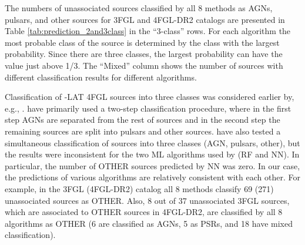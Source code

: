 The numbers of unassociated sources classified by all 8 methods as AGNs, pulsars, and other sources for 3FGL and 4FGL-DR2 catalogs are presented in Table \ref{tab:prediction_2and3class} in the ``3-class'' rows.
For each algorithm the most probable class of the source is determined by the class with the largest probability.
Since there are three classes, the largest probability can have the value just above 1/3.
The ``Mixed'' column shows the number of sources with different classification results for different algorithms.


Classification of \Fermi-LAT 4FGL sources into three classes was considered earlier by, e.g., \cite{2021RAA....21...15Z}.
\cite{2021RAA....21...15Z} have primarily used a two-step classification procedure, where in the first step AGNs are separated from the rest of sources and in the second step the remaining sources are split into pulsars and other sources.
\cite{2021RAA....21...15Z} have also tested a simultaneous classification of sources into three classes (AGN, pulsars, other),
but the results were inconsistent for the two ML algorithms used by \cite{2021RAA....21...15Z} (RF and NN).
In particular, the number of OTHER sources predicted by NN was zero.
In our case, the predictions of various algorithms are relatively consistent with each other.
For example, in the 3FGL (4FGL-DR2) catalog all 8 methods classify 69 (271) unassociated sources as OTHER.
Also, 8 out of 37 unassociated 3FGL sources, which are associated to OTHER sources in 4FGL-DR2, are classified by all 8 algorithms as
OTHER (6 are classified as AGNs, 5 as PSRs, and 18 have mixed classification).

